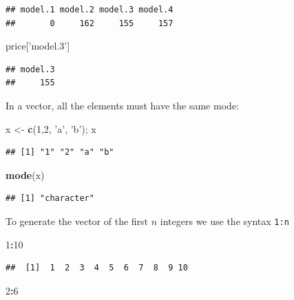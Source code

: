 \documentclass[]{book}
\newenvironment{Shaded}{\begin{snugshade}}{\end{snugshade}}
\newcommand{\DecValTok}[1]{\textcolor[rgb]{0.00,0.00,0.81}{#1}}
\newcommand{\KeywordTok}[1]{\textcolor[rgb]{0.13,0.29,0.53}{\textbf{#1}}}
\newcommand{\NormalTok}[1]{#1}
\newcommand{\OperatorTok}[1]{\textcolor[rgb]{0.81,0.36,0.00}{\textbf{#1}}}
\newcommand{\StringTok}[1]{\textcolor[rgb]{0.31,0.60,0.02}{#1}}
\begin{document}
\begin{verbatim}
## model.1 model.2 model.3 model.4 
##       0     162     155     157
\end{verbatim}

\begin{Shaded}
\begin{Highlighting}[]
\NormalTok{price[}\StringTok{'model.3'}\NormalTok{]}
\end{Highlighting}
\end{Shaded}

\begin{verbatim}
## model.3 
##     155
\end{verbatim}

In a vector, all the elements must have the same mode:

\begin{Shaded}
\begin{Highlighting}[]
\NormalTok{x <-}\StringTok{ }\KeywordTok{c}\NormalTok{(}\DecValTok{1}\NormalTok{,}\DecValTok{2}\NormalTok{, }\StringTok{'a'}\NormalTok{, }\StringTok{'b'}\NormalTok{); x}
\end{Highlighting}
\end{Shaded}

\begin{verbatim}
## [1] "1" "2" "a" "b"
\end{verbatim}

\begin{Shaded}
\begin{Highlighting}[]
\KeywordTok{mode}\NormalTok{(x)}
\end{Highlighting}
\end{Shaded}

\begin{verbatim}
## [1] "character"
\end{verbatim}

To generate the vector of the first \(n\) integers we use the syntax \texttt{1:n}

\begin{Shaded}
\begin{Highlighting}[]
\DecValTok{1}\OperatorTok{:}\DecValTok{10}
\end{Highlighting}
\end{Shaded}

\begin{verbatim}
##  [1]  1  2  3  4  5  6  7  8  9 10
\end{verbatim}

\begin{Shaded}
\begin{Highlighting}[]
\DecValTok{2}\OperatorTok{:}\DecValTok{6}
\end{Highlighting}
\end{Shaded}
\end{document}
